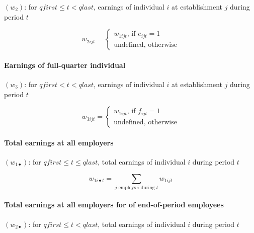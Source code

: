 
$\left( w_{2}\right) $: for $qfirst\leq t<qlast$, earnings of individual $i$
at establishment $j$ during period $t$

\begin{equation}
w_{2ijt}=\left\{ 
\begin{array}{l}
{w_{1ijt}}\text{, if }{e_{ijt}=1} \\ 
\text{{undefined, otherwise}}%
\end{array}%
\right.
\end{equation}

\paragraph{Earnings of full-quarter individual}


$\left( w_{3}\right) $: for $qfirst<t<qlast$, earnings of individual $i$ at
establishment $j$ during period $t$

\begin{equation}
w_{3ijt}=\left\{ 
\begin{array}{l}
{w_{1ijt}}\text{, if }{f_{ijt}=1} \\ 
\text{{undefined, otherwise}}%
\end{array}%
\right.
\end{equation}

\paragraph{Total earnings at all employers}


$\left( w_{1\bullet }\right) $: for $qfirst\leq t\leq qlast$, total earnings
of individual $i$ during period $t$

\begin{equation}
w_{1i\bullet t}=\sum\limits_{j\text{ employs}\;i\text{ during }t}{w_{1ijt}}
\end{equation}

\paragraph{Total earnings at all employers for of end-of-period employees}


$\left( w_{2\bullet }\right) $: for $qfirst\leq t<qlast$, total earnings of
individual $i$ during period $t$

